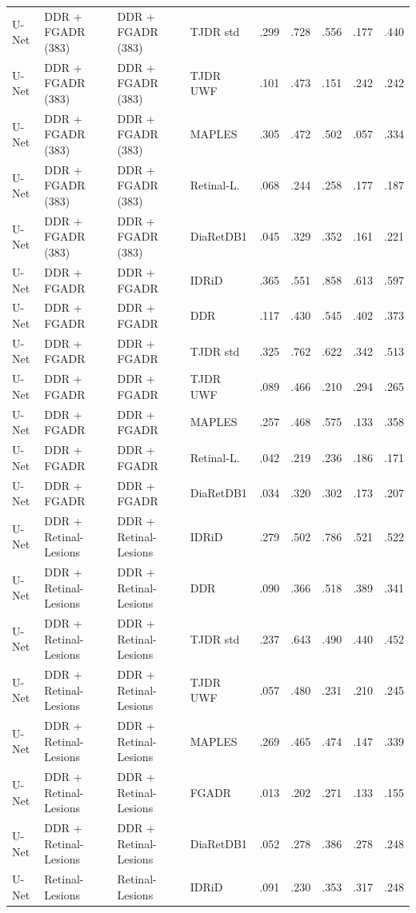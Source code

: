\begin{landscape}
{\begin{longtable}{l l l l c c c c c}
U-Net & DDR + FGADR (383) & DDR + FGADR (383) & TJDR std & .299 & .728 & .556 & .177 & .440 \\
U-Net & DDR + FGADR (383) & DDR + FGADR (383) & TJDR UWF & .101 & .473 & .151 & .242 & .242 \\
U-Net & DDR + FGADR (383) & DDR + FGADR (383) & MAPLES & .305 & .472 & .502 & .057 & .334 \\
U-Net & DDR + FGADR (383) & DDR + FGADR (383) & Retinal-L. & .068 & .244 & .258 & .177 & .187 \\
U-Net & DDR + FGADR (383) & DDR + FGADR (383) & DiaRetDB1 & .045 & .329 & .352 & .161 & .221 \\
U-Net & DDR + FGADR & DDR + FGADR & IDRiD & .365 & .551 & .858 & .613 & .597 \\
U-Net & DDR + FGADR & DDR + FGADR & DDR & .117 & .430 & .545 & .402 & .373 \\
U-Net & DDR + FGADR & DDR + FGADR & TJDR std & .325 & .762 & .622 & .342 & .513 \\
U-Net & DDR + FGADR & DDR + FGADR & TJDR UWF & .089 & .466 & .210 & .294 & .265 \\
U-Net & DDR + FGADR & DDR + FGADR & MAPLES & .257 & .468 & .575 & .133 & .358 \\
U-Net & DDR + FGADR & DDR + FGADR & Retinal-L. & .042 & .219 & .236 & .186 & .171 \\
U-Net & DDR + FGADR & DDR + FGADR & DiaRetDB1 & .034 & .320 & .302 & .173 & .207 \\
U-Net & DDR + Retinal-Lesions & DDR + Retinal-Lesions & IDRiD & .279 & .502 & .786 & .521 & .522 \\
U-Net & DDR + Retinal-Lesions & DDR + Retinal-Lesions & DDR & .090 & .366 & .518 & .389 & .341 \\
U-Net & DDR + Retinal-Lesions & DDR + Retinal-Lesions & TJDR std & .237 & .643 & .490 & .440 & .452 \\
U-Net & DDR + Retinal-Lesions & DDR + Retinal-Lesions & TJDR UWF & .057 & .480 & .231 & .210 & .245 \\
U-Net & DDR + Retinal-Lesions & DDR + Retinal-Lesions & MAPLES & .269 & .465 & .474 & .147 & .339 \\
U-Net & DDR + Retinal-Lesions & DDR + Retinal-Lesions & FGADR & .013 & .202 & .271 & .133 & .155 \\
U-Net & DDR + Retinal-Lesions & DDR + Retinal-Lesions & DiaRetDB1 & .052 & .278 & .386 & .278 & .248 \\
U-Net & Retinal-Lesions & Retinal-Lesions & IDRiD & .091 & .230 & .353 & .317 & .248 \\

\end{longtable}}
\end{landscape}
